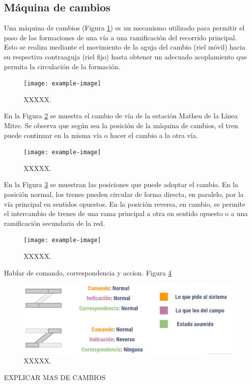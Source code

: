 \subsection{Máquina de cambios}

    Una máquina de cambios (Figura \ref{fig:cambios_1}) es un mecanismo utilizado para permitir el paso de las formaciones de una vía a una ramificación del recorrido principal. Esto se realiza mediante el movimiento de la aguja del cambio (riel móvil) hacia su respectiva contraaguja (riel fijo) hasta obtener un adecuado acoplamiento que permita la circulación de la formación.

    \begin{figure}[!h]
        \centering
        \texttt{[image: example-image]}
        \centering\caption{XXXXX.}
        \label{fig:cambios_1}
    \end{figure}

    En la Figura \ref{fig:cambios_2} se muestra el cambio de vía de la estación Matheu de la Línea Mitre. Se observa que según sea la posición de la máquina de cambios, el tren puede continuar en la misma vía o hacer el cambio a la otra vía.

    \begin{figure}[!h]
        \centering
        \texttt{[image: example-image]}
        \centering\caption{XXXXX.}
        \label{fig:cambios_2}
    \end{figure}

    En la Figura \ref{fig:cambios_3} se muestran las posiciones que puede adoptar el cambio. En la posición normal, los trenes pueden circular de forma directa, en paralelo, por la vía principal en sentidos opuestos. En la posición reversa, en cambio, se permite el intercambio de trenes de una rama principal a otra en sentido opuesto o a una ramificación secundaria de la red.

    \begin{figure}[!h]
        \centering
        \texttt{[image: example-image]}
        \centering\caption{XXXXX.}
        \label{fig:cambios_3}
    \end{figure}

    Hablar de comando, correspondencia y accion. Figura \ref{fig:cambios_4}

    \lipsum[1]
    
    \begin{figure}[!h]
        \centering
        \includegraphics[width=1\textwidth]{Figuras/cambios}
        \centering\caption{XXXXX.}
        \label{fig:cambios_4}
    \end{figure}

EXPLICAR MAS DE CAMBIOS
